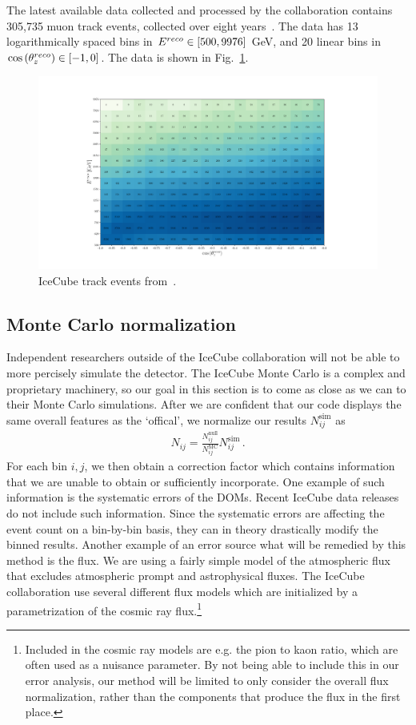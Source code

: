 The latest available data collected and processed by the collaboration contains 305,735 muon track events, collected over eight years~\cite{IC2020}. 
The data has 13 logarithmically spaced bins in $E^{reco} \in [500,9976]$ \si{\GeV}, and 20 linear bins in $\cos{(\theta_z^{reco})} \in [-1,0]$. The data is shown in Fig.~\ref{fig:IC_data}.

\begin{figure}[ht]
    \centering
    \includegraphics[width=0.8\linewidth]{figures/IC_data.pdf}
    \caption{IceCube track events from~\cite{IC2020}.}\label{fig:IC_data}
\end{figure}

\subsection*{Monte Carlo normalization}
Independent researchers outside of the IceCube collaboration will not be able to more percisely
simulate the detector. The IceCube Monte Carlo is a complex and proprietary machinery, so our goal in this 
section is to come as close as we can to their Monte Carlo simulations. After we are confident that 
our code displays the same overall features as the `offical', we normalize our results $N_{ij}^\text{sim}$ as 
\begin{align}\label{eq:MC_norm}
    N_{ij} = \frac{N_{ij}^\text{null}}{N_{ij}^\text{MC}} N_{ij}^\text{sim}\,.
\end{align}
For each bin $i,j$, we then obtain a correction factor which contains information that we are unable
to obtain or sufficiently incorporate. One example of such information is the systematic errors of the DOMs.
Recent IceCube data releases do not include such information. Since the systematic errors are affecting the 
event count on a bin-by-bin basis, they can in theory drastically modify the binned results. Another example of
an error source what will be remedied by this method is the flux. We are using a fairly simple model of the atmospheric 
flux that excludes atmospheric prompt and astrophysical fluxes. The IceCube collaboration use several different flux models which are initialized 
by a parametrization of the cosmic ray flux.\footnote{Included in the cosmic ray models are e.g. the pion to kaon 
ratio, which are often used as a nuisance parameter. By not being able to include this in our error analysis, our method will 
be limited to only consider the overall flux normalization, rather than the components that produce the flux in the first place.}

